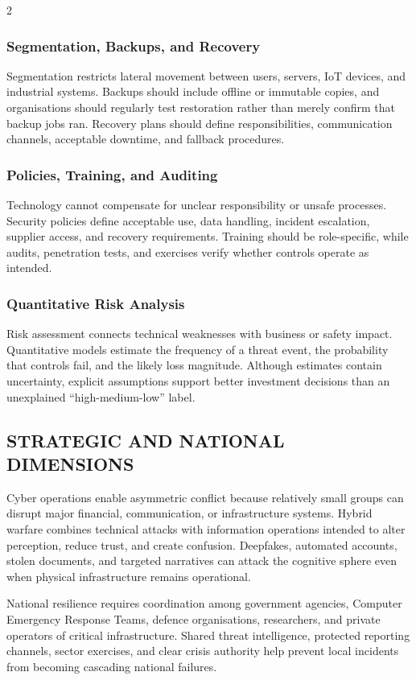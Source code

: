 \begin{multicols}{2}
  \subsubsection*{Segmentation, Backups, and Recovery}
  Segmentation restricts lateral movement between users, servers, IoT devices, and industrial systems. Backups should include offline or immutable copies, and organisations should regularly test restoration rather than merely confirm that backup jobs ran. Recovery plans should define responsibilities, communication channels, acceptable downtime, and fallback procedures.

  \subsubsection*{Policies, Training, and Auditing}
  Technology cannot compensate for unclear responsibility or unsafe processes. Security policies define acceptable use, data handling, incident escalation, supplier access, and recovery requirements. Training should be role-specific, while audits, penetration tests, and exercises verify whether controls operate as intended.

  \subsubsection*{Quantitative Risk Analysis}
  Risk assessment connects technical weaknesses with business or safety impact. Quantitative models estimate the frequency of a threat event, the probability that controls fail, and the likely loss magnitude. Although estimates contain uncertainty, explicit assumptions support better investment decisions than an unexplained “high-medium-low” label.

  \subsection*{\centering\uppercase{Strategic and National Dimensions}}
  Cyber operations enable asymmetric conflict because relatively small groups can disrupt major financial, communication, or infrastructure systems. Hybrid warfare combines technical attacks with information operations intended to alter perception, reduce trust, and create confusion. Deepfakes, automated accounts, stolen documents, and targeted narratives can attack the cognitive sphere even when physical infrastructure remains operational.

  \noindent
  National resilience requires coordination among government agencies, Computer Emergency Response Teams, defence organisations, researchers, and private operators of critical infrastructure. Shared threat intelligence, protected reporting channels, sector exercises, and clear crisis authority help prevent local incidents from becoming cascading national failures.


\end{multicols}
